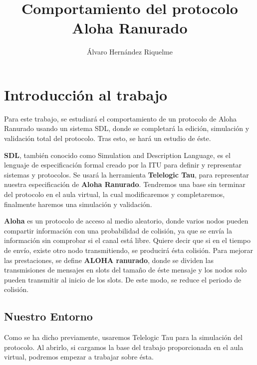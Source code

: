 \documentclass{article}
\title{Comportamiento del protocolo Aloha Ranurado}
\author{Álvaro Hernández Riquelme}
\begin{document}
\maketitle

\tableofcontents
\newpage



\section{Introducción al trabajo}

Para este trabajo, se estudiará el comportamiento de un protocolo de Aloha Ranurado usando un sistema SDL, donde se completará la edición, simulación y validación total del protocolo. Tras esto, se hará un estudio de éste.

\quad

\textbf{SDL}, también conocido como Simulation and Description Language, es el lenguaje de especificación formal creado por la ITU para definir y representar sistemas y protocolos. Se usará la herramienta \textbf{Telelogic Tau}, para representar nuestra especificación de \textbf{Aloha Ranurado}. Tendremos una base sin terminar del protocolo en el aula virtual, la cual modificaremos y completaremos, finalmente haremos una simulación y validación. 

\quad

\textbf{Aloha} es un protocolo de acceso al medio aleatorio, donde varios nodos pueden compartir información con una probabilidad de colisión, ya que se envía la información sin comprobar si el canal está libre. Quiere decir que si en el tiempo de envío, existe otro nodo transmitiendo, se producirá ésta colisión. Para mejorar las prestaciones, se define \textbf{ALOHA ranurado}, donde se dividen las transmisiones de mensajes en slots del tamaño de éste mensaje y los nodos solo pueden transmitir al inicio de los slots. De este modo, se reduce el periodo de colisión.

\subsection{Nuestro Entorno}

Como se ha dicho previamente, usaremos Telelogic Tau para la simulación del protocolo. Al abrirlo, si cargamos la base del trabajo proporcionada en el aula virtual, podremos empezar a trabajar sobre ésta.
\end{document}
